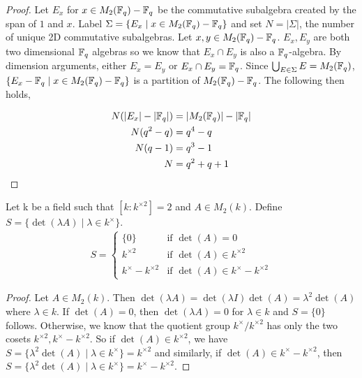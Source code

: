 \documentclass{amsart}
\begin{document}
\begin{proof}
    Let $E_x$ for $x \in M_2(\protect\mathbb{F}_q) - \protect\mathbb{F}_q$ be the commutative subalgebra created by the span of $1$ and $x$.
    Label $\Sigma = \{E_x \mid x \in M_2(\protect\mathbb{F}_q) - \protect\mathbb{F}_q \}$ and set $N = |\Sigma|$, the number of unique 2D commutative subalgebras. Let $x, y \in M_2(\protect\mathbb{F}_q) - \protect\mathbb{F}_q$. $E_x, E_y$ are both two dimensional $\protect\mathbb{F}_q$ algebras so we know that $E_x \cap E_y$ is also a $\protect\mathbb{F}_q$-algebra. By dimension arguments, either $E_x = E_y$ or $E_x \cap E_y = \protect\mathbb{F}_q$. Since $\bigcup_{E \in \Sigma}E = M_2(\protect\mathbb{F}_q)$, $\{E_x - \protect\mathbb{F}_q \mid x \in M_2(\protect\mathbb{F}_q) - \protect\mathbb{F}_q \}$ is a partition of $M_2(\protect\mathbb{F}_q) - \protect\mathbb{F}_q$. The following then holds,

    \begin{align*}
        N ( | E_x | - | \protect\mathbb{F}_q | ) &= | M_2(\protect\mathbb{F}_q) | - | \protect\mathbb{F}_q | \\
        N(q^2 - q) &= q^4 - q \\
        N(q-1) &= q^3 - 1 \\
        N &= q^2 + q + 1
    \end{align*}
    
    \end{proof} 

    \begin{lemma}\label{square-quotient-cosets}
    Let k be a field such that $\left[k : k^{\times2}\right] = 2$ and $A \in M_2(k)$. Define $S = \{\det( \lambda A ) \mid \lambda \in k^{\times} \}$.  \begin{align*}
        S =
        \begin{cases}
            \{0\}                     &\text{if } \det(A) = 0 \\
            k^{\times2}              &\text{if } \det(A) \in k^{\times2} \\
            k^{\times} - k^{\times2} &\text{if } \det(A) \in k^{\times} - k^{\times2}
        \end{cases}
    \end{align*}
\end{lemma}
\begin{proof}
    Let $A \in M_2(k)$. Then $\det(\lambda A) = \det(\lambda I)\det(A) = \lambda^2\det(A)$ where $\lambda \in k$.  If $\det(A) = 0$, then $\det(\lambda A) = 0$ for $\lambda \in k$ and $S = \{0\}$ follows. Otherwise, we know that the quotient group $k^{\times}/k^{\times2}$ has only the two cosets $k^{\times2}, k^{\times} - k^{\times2}$. So if $\det(A) \in k^{\times2}$, we have $S = \{\lambda^2 \det(A) \mid \lambda \in k^{\times}\} = k^{\times2}$ and similarly, if $\det(A) \in k^{\times} - k^{\times2}$, then $S = \{\lambda^2 \det(A) \mid \lambda \in k^{\times}\} = k^{\times} - k^{\times2}$.
\end{proof}
\end{document}
